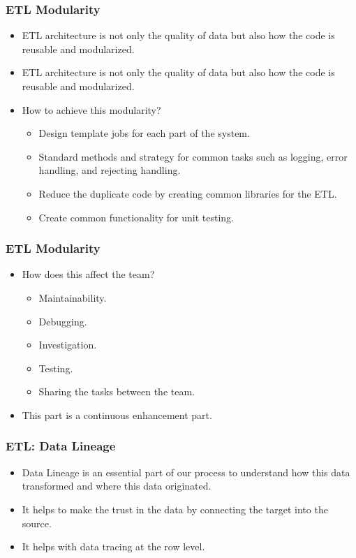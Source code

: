 \begin{frame}
	\frametitle{ETL Modularity}
	\begin{itemize}[<+->]
		\item ETL architecture is not only the quality of data but also how the code is reusable and modularized. 
		\item ETL architecture is not only the quality of data but also how the code is reusable and modularized. 		
		\item How to achieve this modularity?
		\begin{itemize}[<+->]
			\item Design template jobs for each part of the system.
			\item Standard methods and strategy for common tasks such as logging, error handling, and rejecting handling.
			\item  Reduce the duplicate code by creating  common libraries for the ETL.
			\item  Create common functionality for unit testing.

		\end{itemize}
	\end{itemize}
\end{frame}

\begin{frame}
	\frametitle{ETL Modularity}
	\begin{itemize}[<+->]
		\item How does this affect the team?
		\begin{itemize}[<+->]
			\item Maintainability.
			\item Debugging.
			\item Investigation.
			\item Testing.
			\item Sharing the tasks between the team.

		\end{itemize}
		\item This part is a continuous enhancement part.
	\end{itemize}
\end{frame}
\begin{frame}
	\frametitle{ETL: Data Lineage}
	\begin{itemize}[<+->]
		\item Data Lineage is an essential part of our process to understand how this data transformed and where this data originated.
		\item It helps to make the trust in the data by connecting the target into the source.
		\item It helps with data tracing at the row level.
	\end{itemize}
\end{frame}

